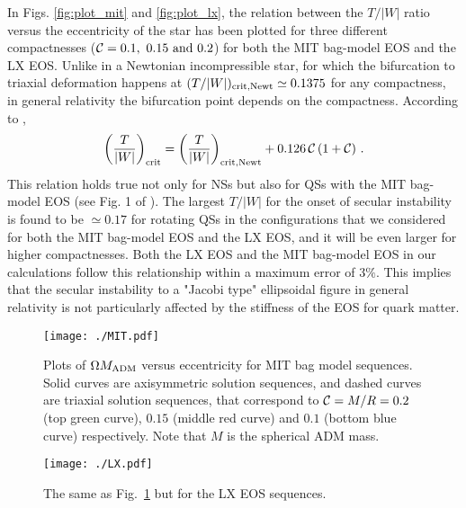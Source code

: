 \documentclass[twocolumn,superscriptaddress,showpacs,prd,aps,amsmath,amssymb,nofootinbib]{revtex4-1}
\begin{document}
In Figs. \ref{fig:plot_mit} and \ref{fig:plot_lx}, the relation between
the $T/|W|$ ratio versus the eccentricity of the star has been plotted
for three different compactnesses
($\compa=0.1,\ 0.15\ \mathrm{and}\ 0.2$) for both the MIT bag-model EOS
and the LX EOS.  Unlike in a Newtonian incompressible star, for which the
bifurcation to triaxial deformation happens at $(T/|W|)_{\rm crit,
 Newt}\simeq 0.1375$ for any compactness, in general relativity the
bifurcation point depends on the compactness. According to
\cite{rosinska2002},
\begin{equation}
\left(\frac{T}{|W|}\right)_\mathrm{\rm
  crit}=\left(\frac{T}{|W|}\right)_{\rm crit, Newt}
+0.126 \, \mathcal{C}\left(1+\mathcal{C}\right) \,.
\label{eq:twrelation}
\end{equation}
%
This relation holds true not only for NSs but also for QSs with the MIT
bag-model EOS (see Fig. 1 of \cite{rosinska2003}). The largest $T/|W|$
for the onset of secular instability is found to be $\simeq 0.17$ for
rotating QSs in the configurations that we considered for both the MIT
bag-model EOS and the LX EOS, and it will be even larger for higher
compactnesses. Both the LX EOS and the MIT bag-model EOS in our
calculations follow this relationship within a maximum error of
$3\%$. This implies that the secular instability to a "Jacobi type"
ellipsoidal figure in general relativity is not particularly affected by
the stiffness of the EOS for quark matter.

\begin{figure}
\begin{center}
\texttt{[image: ./MIT.pdf]}
\end{center}
\caption{Plots of $\Omega M_{\rm ADM}$ versus eccentricity for MIT bag
  model sequences. Solid curves are axisymmetric solution sequences, and
  dashed curves are triaxial solution sequences, that correspond to
  $\mathcal{C}=M/R=0.2$ (top green curve), $0.15$ (middle red curve) and $0.1$
  (bottom blue curve) respectively. Note that $M$ is the spherical ADM
  mass. }
\label{fig:plot_mit_omeM}
\end{figure}

\begin{figure}
\begin{center}
\texttt{[image: ./LX.pdf]}
\end{center}
\caption{The same as Fig.~\ref{fig:plot_mit_omeM} but
  for the LX EOS sequences. }
\label{fig:plot_lx_omeM}
\end{figure}
\end{document}
